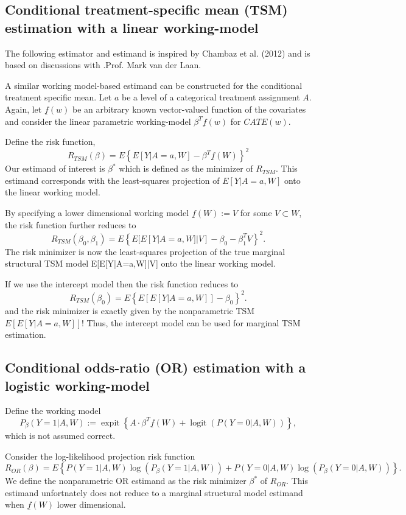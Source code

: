 \documentclass{article}
\DeclareMathOperator{\logit}{logit}
\DeclareMathOperator{\expit}{expit}
\begin{document}
\subsection{Conditional treatment-specific mean (TSM) estimation with a linear working-model}
The following estimator and estimand is inspired by Chambaz et al. (2012) and is based on discussions with .Prof. Mark van der Laan.



A similar working model-based estimand can be constructed for the conditional treatment specific mean. Let $a$ be a level of a categorical treatment assignment $A$. Again, let $\underline{f}(w)$ be an arbitrary known vector-valued function of the covariates and consider the linear parametric working-model $\beta^T \underline{f}(w)$ for $CATE(w)$. 

Define the risk function,
$$R_{TSM}(\beta) = E \left\{E[Y|A=a,W] -  \beta^T \underline{f}(W) \right\}^2$$
Our estimand of interest is $\beta^*$ which is defined as the minimizer of $R_{TSM}$. This estimand corresponds with the least-squares projection of $E[Y|A=a,W]$ onto the linear working model.

By specifying a lower dimensional working model $\underline{f}(W) := V$ for some $V \subset W$, the risk function further reduces to
$$R_{TSM}(\beta_0, \beta_1) = E \left\{E[E[Y|A=a,W]|V] - \beta_0 - \beta_1^T V \right\}^2.$$
The risk minimizer is now the least-squares projection of the true marginal structural TSM model E[E[Y|A=a,W]|V] onto the linear working model.


If we use the intercept model then the risk function reduces to
$$R_{TSM}(\beta_0) = E \left\{E[E[Y|A=a,W]] - \beta_0  \right\}^2.$$
and the risk minimizer is exactly given by the nonparametric TSM $E[E[Y|A=a,W]]$! Thus, the intercept model can be used for marginal TSM estimation.


\subsection{Conditional odds-ratio (OR) estimation with a logistic working-model}
Define the working model
$$P_{\beta}(Y=1|A,W) := \expit\left\{A \cdot \beta^T \underline{f}(W) + \logit(P(Y=0|A,W))\right\},$$
which is not assumed correct.

Consider the log-likelihood projection risk function
$$R_{OR}(\beta) = E \left\{P(Y=1|A,W)\log(P_{\beta}(Y=1|A,W)) + P(Y=0|A,W)\log(P_{\beta}(Y=0|A,W)) \right\}.$$
We define the nonparametric OR estimand as the risk minimizer $\beta^*$ of $R_{OR}$. This estimand unfortnately does not reduce to a marginal structural model estimand when $\underline{f}(W)$ lower dimensional.
\end{document}
